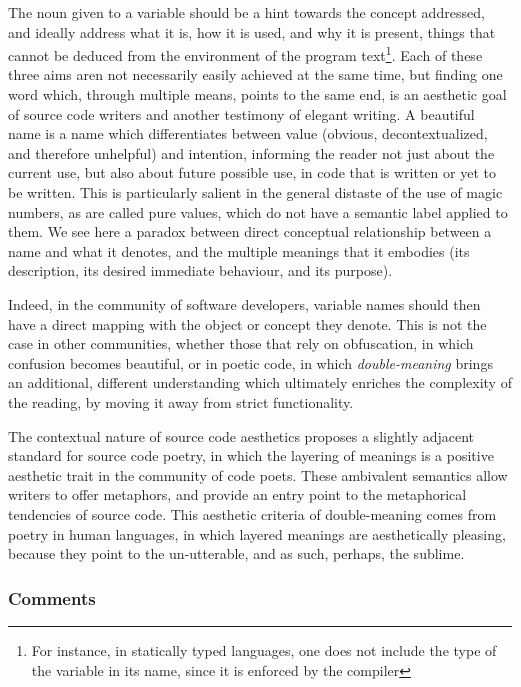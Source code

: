 The noun given to a variable should be a hint towards the concept addressed, and ideally address what it is, how it is used, and why it is present, things that cannot be deduced from the environment of the program text\footnote{For instance, in statically typed languages, one does not include the type of the variable in its name, since it is enforced by the compiler}. Each of these three aims aren not necessarily easily achieved at the same time, but finding one word which, through multiple means, points to the same end, is an aesthetic goal of source code writers and another testimony of elegant writing. A beautiful name is a name which differentiates between value (obvious, decontextualized, and therefore unhelpful) and intention, informing the reader not just about the current use, but also about future possible use, in code that is written or yet to be written. This is particularly salient in the general distaste of the use of magic numbers, as are called pure values, which do not have a semantic label applied to them. We see here a paradox between direct conceptual relationship between a name and what it denotes, and the multiple meanings that it embodies (its description, its desired immediate behaviour, and its purpose).

Indeed, in the community of software developers, variable names should then have a direct mapping with the object or concept they denote. This is not the case in other communities, whether those that rely on obfuscation, in which confusion becomes beautiful, or in poetic code, in which \emph{double-meaning} brings an additional, different understanding which ultimately enriches the complexity of the reading, by moving it away from strict functionality.

The contextual nature of source code aesthetics proposes a slightly adjacent standard for source code poetry, in which the layering of meanings is a positive aesthetic trait in the community of code poets. These ambivalent semantics allow writers to offer metaphors, and provide an entry point to the metaphorical tendencies of source code. This aesthetic criteria of double-meaning comes from poetry in human languages, in which layered meanings are aesthetically pleasing, because they point to the un-utterable, and as such, perhaps, the sublime\citep{aquilina_computational_2015}.

\subsubsection{Comments}
\label{subsubsec:framework-comments}


